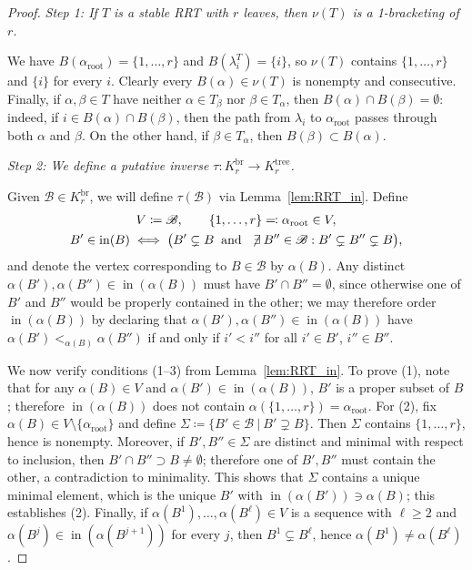 \documentclass[11pt]{amsart}
\theoremstyle{definition}
\theoremstyle{remark}
\theoremstyle{plain}
\newcommand{\sB}{\mathscr{B}}
\newcommand{\on}{\operatorname}
\newcommand{\incom}{\on{in}}
\renewcommand{\root}{{\on{root}}}
\newcommand{\tree}{{\on{tree}}}
\newcommand{\br}{{\on{br}}}
\begin{document}
\begin{proof}
\noindent\emph{Step 1: If $T$ is a stable RRT with $r$ leaves, then $\nu(T)$ is a 1-bracketing of $r$.}

\medskip

\noindent We have $B({\alpha_\root}) = \{1,\ldots,r\}$ and $B(\lambda_i^T) = \{i\}$, so $\nu(T)$ contains $\{1,\ldots,r\}$ and $\{i\}$ for every $i$.
Clearly every $B(\alpha) \in \nu(T)$ is nonempty and consecutive.
Finally, if $\alpha, \beta \in T$ have neither $\alpha \in T_\beta$ nor $\beta \in T_\alpha$, then $B(\alpha) \cap B(\beta) = \emptyset$: indeed, if $i \in B(\alpha) \cap B(\beta)$, then the path from $\lambda_i$ to $\alpha_\root$ passes through both $\alpha$ and $\beta$.
On the other hand, if $\beta \in T_\alpha$, then $B(\beta) \subset B(\alpha)$.

\medskip

\noindent\emph{Step 2: We define a putative inverse $\tau\colon K_r^\br \to K_r^\tree$.}

\medskip

\noindent Given $\sB \in K_r^\br$, we will define $\tau(\sB)$ via Lemma~\ref{lem:RRT_in}.
Define
\begin{gather}
V \coloneqq \sB,
\qquad
\{1,\ldots,r\} \eqqcolon \alpha_\root \in V,
\\
B' \in \incom(B) \iff \bigl(B' \subsetneq B \:\text{ and }\: \not\!\exists\: B'' \in \sB: B' \subsetneq B'' \subsetneq B\bigr),
\nonumber
\end{gather}
and denote the vertex corresponding to $B \in \sB$ by $\alpha(B)$. \label{p:alpha_B}
Any distinct $\alpha(B'), \alpha(B'') \in \incom(\alpha(B))$ must have $B' \cap B'' = \emptyset$, since otherwise one of $B'$ and $B''$ would be properly contained in the other; we may therefore order $\incom(\alpha(B))$ by declaring that $\alpha(B'), \alpha(B'') \in \incom(\alpha(B))$ have $\alpha(B') <_{\alpha(B)} \alpha(B'')$ if and only if $i' < i''$ for all $i' \in B'$, $i'' \in B''$.

We now verify conditions (1--3) from Lemma~\ref{lem:RRT_in}.
To prove (1), note that for any $\alpha(B) \in V$ and $\alpha(B') \in \incom(\alpha(B))$, $B'$ is a proper subset of $B$; therefore $\incom(\alpha(B))$ does not contain $\alpha(\{1,\ldots,r\}) = \alpha_\root$.
For (2), fix $\alpha(B) \in V \setminus \{\alpha_\root\}$ and define $\Sigma \coloneqq \{B' \in \sB \:|\: B' \supsetneq B\}$.
Then $\Sigma$ contains $\{1,\ldots,r\}$, hence is nonempty.
Moreover, if $B', B'' \in \Sigma$ are distinct and minimal with respect to inclusion, then $B' \cap B'' \supset B \neq \emptyset$; therefore one of $B', B''$ must contain the other, a contradiction to minimality.
This shows that $\Sigma$ contains a unique minimal element, which is the unique $B'$ with $\incom(\alpha(B')) \ni \alpha(B)$; this establishes (2).
Finally, if $\alpha(B^1), \ldots, \alpha(B^\ell) \in V$ is a sequence with $\ell \geq 2$ and $\alpha(B^j) \in \incom(\alpha(B^{j+1}))$ for every $j$, then $B^1 \subsetneq B^\ell$, hence $\alpha(B^1) \neq \alpha(B^\ell)$.


\end{proof}
\end{document}
